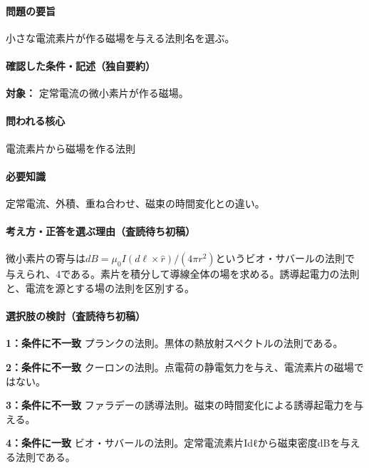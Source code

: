 \paragraph{問題の要旨} 小さな電流素片が作る磁場を与える法則名を選ぶ。

\paragraph{確認した条件・記述（独自要約）}\mbox{}\par

\noindent\textbf{対象：} 定常電流の微小素片が作る磁場。\par

\paragraph{問われる核心} 電流素片から磁場を作る法則

\paragraph{必要知識} 定常電流、外積、重ね合わせ、磁束の時間変化との違い。

\paragraph{考え方・正答を選ぶ理由（査読待ち初稿）} 微小素片の寄与は\(dB=\mu_0 I(d\ell\times\hat r)/(4\pi r^2)\)というビオ・サバールの法則で与えられ、4である。素片を積分して導線全体の場を求める。誘導起電力の法則と、電流を源とする場の法則を区別する。

\paragraph{選択肢の検討（査読待ち初稿）}\mbox{}\par

\noindent\textbf{1：条件に不一致} プランクの法則。黒体の熱放射スペクトルの法則である。\par

\noindent\textbf{2：条件に不一致} クーロンの法則。点電荷の静電気力を与え、電流素片の磁場ではない。\par

\noindent\textbf{3：条件に不一致} ファラデーの誘導法則。磁束の時間変化による誘導起電力を与える。\par

\noindent\textbf{4：条件に一致} ビオ・サバールの法則。定常電流素片Idℓから磁束密度dBを与える法則である。\par

